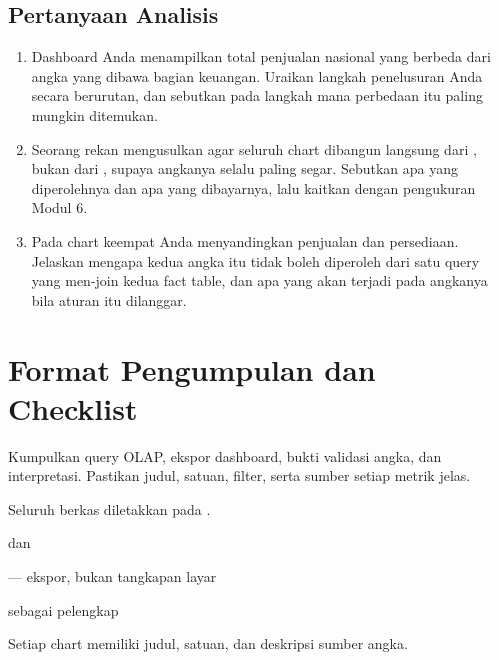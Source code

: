 \subsection{Pertanyaan Analisis}

\begin{enumerate}[leftmargin=1.4em]
  \item Dashboard Anda menampilkan total penjualan nasional yang berbeda dari
        angka yang dibawa bagian keuangan. Uraikan langkah penelusuran Anda
        secara berurutan, dan sebutkan pada langkah mana perbedaan itu paling
        mungkin ditemukan.
  \item Seorang rekan mengusulkan agar seluruh chart dibangun langsung dari
        , bukan dari , supaya
        angkanya selalu paling segar. Sebutkan apa yang diperolehnya dan apa
        yang dibayarnya, lalu kaitkan dengan pengukuran Modul 6.
  \item Pada chart keempat Anda menyandingkan penjualan dan persediaan.
        Jelaskan mengapa kedua angka itu tidak boleh diperoleh dari satu query
        yang men-join kedua fact table, dan apa yang akan terjadi pada
        angkanya bila aturan itu dilanggar.
\end{enumerate}

\section{Format Pengumpulan dan Checklist}

Kumpulkan query OLAP, ekspor dashboard, bukti validasi angka, dan interpretasi.
Pastikan judul, satuan, filter, serta sumber setiap metrik jelas.

Seluruh berkas diletakkan pada .

\begin{ceklis}
  \item {} dan 
  \item {}
  \item {}
  \item {} --- ekspor, bukan tangkapan layar
  \item {} sebagai pelengkap
  \item {}
  \item {}
  \item {}
  \item Setiap chart memiliki judul, satuan, dan deskripsi sumber angka.
\end{ceklis}

